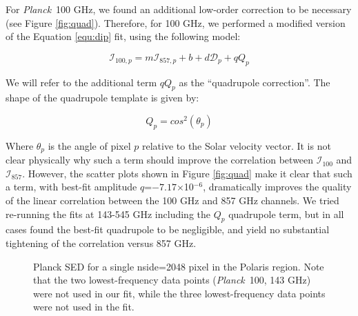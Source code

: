 \documentclass{emulateapj}
\newcommand{\PLANCK}{{\it Planck}}
\begin{document}
For \PLANCK~100 GHz, we found an additional low-order correction to be
necessary (see Figure \ref{fig:quad}). Therefore, for 100 GHz, we performed a 
modified version of the Equation \ref{equ:dip} fit, using the following model:

\begin{equation} \label{equ:quad}
\mathcal{I}_{100, p} = m\mathcal{I}_{857, p} + b + d\mathcal{D}_p + qQ_p
\end{equation}

We will refer to the additional term $qQ_p$ as the ``quadrupole correction''. 
The shape of the quadrupole template is given by:

\begin{equation}
Q_p = cos^2(\theta_p)
\end{equation}

Where $\theta_p$ is the angle of pixel $p$ relative to the Solar velocity 
vector. It is not clear physically why such a term should improve the 
correlation between $\mathcal{I}_{100}$ and $\mathcal{I}_{857}$. However, the 
scatter plots shown in Figure \ref{fig:quad} make it clear that such a term, 
with best-fit amplitude $q$=$-7.17$$\times$10$^{-6}$, dramatically improves the
quality of the linear correlation between the 100 GHz and 857 GHz channels. We 
tried re-running the fits at 143-545 GHz including the $Q_p$ quadrupole term, 
but in all cases found the best-fit quadrupole to be negligible, and yield no 
substantial tightening of the correlation versus 857 GHz.



\begin{figure}
\begin{center}
\caption{\label{fig:sed} Planck SED for a single nside=2048 pixel in the 
Polaris region. Note that the two lowest-frequency data points (\PLANCK~100, 
143 GHz) were not used in our fit, while the three lowest-frequency data
points were not used in the \cite{planckdust} fit.}
\end{center}
\end{figure}

\end{document}
